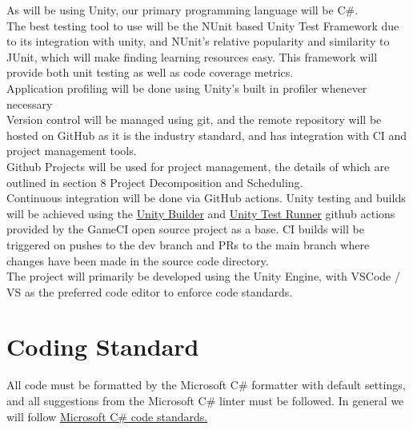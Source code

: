 \documentclass{article}
\begin{document}
As will be using Unity, our primary programming language will be C\#.\\

The best testing tool to use will be the NUnit based Unity Test Framework due to its integration with unity, 
and NUnit's relative popularity and similarity to JUnit, 
which will make finding learning resources easy. 
This framework will provide both unit testing as well as code coverage metrics.\\

Application profiling will be done using Unity's built in profiler whenever necessary\\

Version control will be managed using git, 
and the remote repository will be hosted on GitHub as it is the industry standard, 
and has integration with CI and project management tools.\\

Github Projects will be used for project management, 
the details of which are outlined in section 8 Project Decomposition and Scheduling.\\

Continuous integration will be done via GitHub actions. 
Unity testing and builds will be achieved using the 
\href{https://github.com/marketplace/actions/unity-builder}{Unity Builder} 
and \href{https://github.com/marketplace/actions/unity-test-runner}{Unity Test Runner} 
github actions provided by the GameCI open source project as a base. 
CI builds will be triggered on pushes to the dev branch and PRs to the main branch 
where changes have been made in the source code directory.\\

The project will primarily be developed using the Unity Engine, 
with VSCode / VS as the preferred code editor to enforce code standards. \\


\section{Coding Standard}

All code must be formatted by the Microsoft C\# formatter with default settings, 
and all suggestions from the Microsoft C\# linter must be followed. 
In general we will follow \href{https://learn.microsoft.com/en-us/dotnet/csharp/fundamentals/coding-style/coding-conventions}{Microsoft C\# code standards.}

\newpage{}
\end{document}
